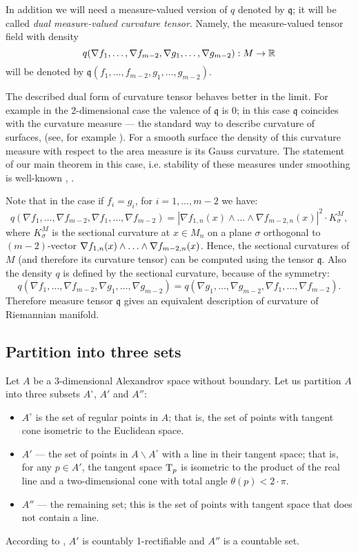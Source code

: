 In addition we will need a measure-valued version of $q$ denoted by $\mathfrak{q}$;
it will be called \emph{dual measure-valued curvature tensor}.
Namely, the measure-valued tensor field with density
\[q(\nabla f_1,\dots,\nabla f_{m-2},\nabla g_1,\dots,\nabla g_{m-2}): M\to\mathbb{R}\]
will be denoted by $\mathfrak{q}(f_1,\dots,f_{m-2},g_1,\dots,g_{m-2})$.


The described dual form of curvature tensor behaves better in the limit.
For example in the 2-dimensional case the valence of $\mathfrak{q}$ is $0$;
in this case $\mathfrak{q}$ coincides with the curvature measure --- the standard way to describe curvature of surfaces, 
(see, for example \cite{R}).
For a smooth surface the density of this curvature measure with respect to the area measure
is its Gauss curvature.
The statement of our main theorem in this case, i.e. 
stability of these measures under smoothing
is well-known \cite[Theorem 8.4.2]{R}, \cite{AZ}.


Note that in the case if $f_i=g_i$, for $i=1,\dots,m-2$
we have:
$$q(\nabla f_1,\dots,\nabla f_{m-2},\nabla f_1,\dots,\nabla f_{m-2})=|\nabla f_{1,n}(x)\wedge\dots \wedge\nabla f_{m-2,n}(x)|^2\cdot K^M_\sigma, $$
where $K^M_\sigma $ is the sectional curvature at $x\in M_n$
on a plane $\sigma$ orthogonal to $(m-2)$-vector
$\nabla f_{1,n}(x)\wedge\zz\dots \wedge\nabla f_{m-2,n}(x)$.
Hence, the sectional curvatures of $M$ (and therefore its curvature tensor) can  be computed using the tensor
$\mathfrak{q}$.
Also the density $q$ is defined by the sectional curvature,
because of the symmetry:
$${q}(\nabla f_1,\dots,\nabla f_{m-2},\nabla g_1,\dots,\nabla g_{m-2})=
{q}(\nabla g_1,\dots,\nabla g_{m-2},\nabla f_1,\dots,\nabla f_{m-2}).$$
Therefore measure tensor $\mathfrak{q}$
gives an equivalent description of curvature of Riemannian manifold.


\subsection{Partition into three sets}

Let $A$ be a 3-dimensional Alexandrov space without boundary. 
Let us partition $A$ into three subsets $A^\circ$, $A'$ and $A''$:
\begin{itemize}
\item $A^\circ$ is the set of regular points in $A$; that is, the set of points with tangent cone isometric to the Euclidean space.
\item $A'$ --- the set of points in $A\backslash A^\circ$ with a line in their tangent space; that is, for any $p\in A'$, the tangent space $\text{\rm T}_p$ is isometric to the product of the real line and a two-dimensional cone with total angle $\theta(p)<2\cdot \pi$.
\item $A''$ --- the remaining set; this is the set of points with tangent space that does not contain a line.
\end{itemize}
According to \cite{li-naber}, $A'$ is countably 1-rectifiable and $A''$ is a countable set. 


